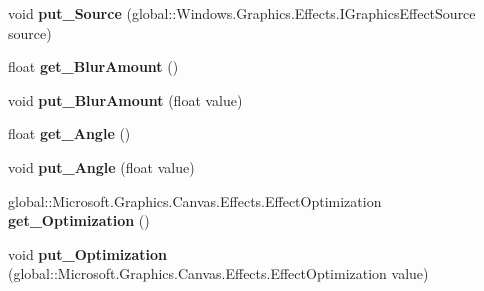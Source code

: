 \begin{DoxyCompactItemize}
\mbox{\label{interface_microsoft_1_1_graphics_1_1_canvas_1_1_effects_1_1_i_directional_blur_effect_a2ac36071af70289687b3c9a8a77dcf46}} 
void {\bfseries put\+\_\+\+Source} (global\+::\+Windows.\+Graphics.\+Effects.\+I\+Graphics\+Effect\+Source source)
\item 
\mbox{\label{interface_microsoft_1_1_graphics_1_1_canvas_1_1_effects_1_1_i_directional_blur_effect_a4678a1fcff40d964531dcc8bec2c2623}} 
float {\bfseries get\+\_\+\+Blur\+Amount} ()
\item 
\mbox{\label{interface_microsoft_1_1_graphics_1_1_canvas_1_1_effects_1_1_i_directional_blur_effect_ab5a1c0e6691e6caf3350123e055c9cc2}} 
void {\bfseries put\+\_\+\+Blur\+Amount} (float value)
\item 
\mbox{\label{interface_microsoft_1_1_graphics_1_1_canvas_1_1_effects_1_1_i_directional_blur_effect_ad5925e9f76f210acd008a4877fb9e527}} 
float {\bfseries get\+\_\+\+Angle} ()
\item 
\mbox{\label{interface_microsoft_1_1_graphics_1_1_canvas_1_1_effects_1_1_i_directional_blur_effect_a7e8558ed00f4de1768f22d9edc7463be}} 
void {\bfseries put\+\_\+\+Angle} (float value)
\item 
\mbox{\label{interface_microsoft_1_1_graphics_1_1_canvas_1_1_effects_1_1_i_directional_blur_effect_aac219bc783a9db2269f2a420ca5e332c}} 
global\+::\+Microsoft.\+Graphics.\+Canvas.\+Effects.\+Effect\+Optimization {\bfseries get\+\_\+\+Optimization} ()
\item 
\mbox{\label{interface_microsoft_1_1_graphics_1_1_canvas_1_1_effects_1_1_i_directional_blur_effect_af3c7a1c1a75107541138dc590902c805}} 
void {\bfseries put\+\_\+\+Optimization} (global\+::\+Microsoft.\+Graphics.\+Canvas.\+Effects.\+Effect\+Optimization value)

\end{DoxyCompactItemize}
